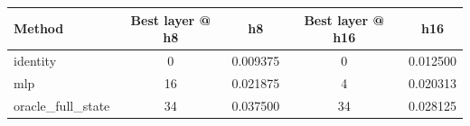 \begin{tabular}{lcccc}
\toprule
Method & Best layer @ h8 & h8 & Best layer @ h16 & h16 \\
\midrule
identity & 0 & 0.009375 & 0 & 0.012500 \\
mlp & 16 & 0.021875 & 4 & 0.020313 \\
oracle\_full\_state & 34 & 0.037500 & 34 & 0.028125 \\
\bottomrule
\end{tabular}
